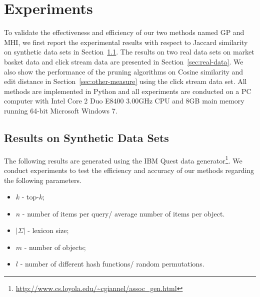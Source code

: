 
%
%

\chapter{Experiments}
\label{ch:exp}

To validate the effectiveness and efficiency of our two methods named GP and MHI, we first report the experimental results with respect to Jaccard similarity on synthetic data sets in Section~\ref{sec:syn-data}. The results on two real data sets on market basket data and click stream data are presented in Section~\ref{sec:real-data}. We also show the performance of the pruning algorithms on Cosine similarity and edit distance in Section~\ref{sec:other-measure} using the click stream data set. All methods are implemented in Python and all experiments are conducted on a PC computer with Intel Core 2 Duo E8400 3.00GHz CPU and 8GB main memory running 64-bit Microsoft Windows 7.


\section{Results on Synthetic Data Sets}
\label{sec:syn-data}
The following results are generated using the IBM Quest data generator\footnote{\url{http://www.cs.loyola.edu/~cgiannel/assoc_gen.html}}. We conduct experiments to test the efficiency and accuracy of our methods regarding the following parameters. 

\begin{itemize}
\item $k$ - top-$k$; 
\item $n$ - number of items per query/ average number of items per object.
\item $|\Sigma|$ - lexicon size;
\item $m$ - number of objects;
\item $l$ - number of different hash functions/ random permutations.
\end{itemize}

